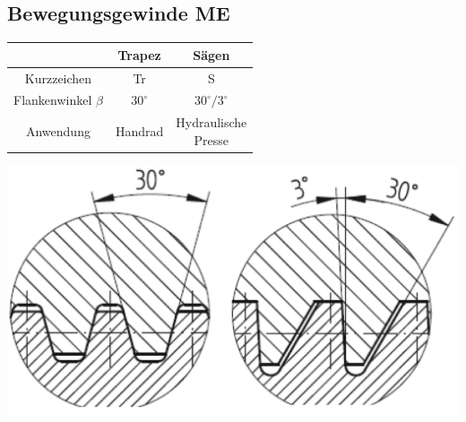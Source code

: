 \subsection{Bewegungsgewinde \hfill ME}
\begin{minipage}{0.58\linewidth}
    \begin{center}
        \begin{scriptsize}
            \begin{tabular}{|c|c|c|}
            \hline
            \null & \cellcolor{LimeGreen}Trapez & \cellcolor{GreenYellow}Sägen\\
            \hline
            Kurzzeichen & Tr & S \\
            \hline
            Flankenwinkel $\beta$ & $30^\circ$ & $30^\circ / 3^\circ$\\
            \hline
            Anwendung & Handrad & \thead{\scriptsize Hydraulische \\\scriptsize Presse}\\
            \hline
        \end{tabular}
        \end{scriptsize}
    \end{center}
\end{minipage}
\begin{minipage}{0.4\linewidth}
    \begin{center}
        \includegraphics[width = 0.9\linewidth]{MAEIP_BewG}
    \end{center}
\end{minipage}